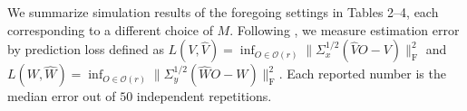\documentclass[11pt]{article}
\newcommand{\nb}[1]{\textcolor{orange}{\texttt{[#1]}}}
\newcommand{\dc}[1]{\{#1\}} %
\newcommand{\0}{{\mathbf{0}}}
\begin{document}
We summarize simulation results of the foregoing settings in Tables 2--4, 
each corresponding to a different choice of $M$. 
Following \cite{gao2017sparse}, we measure estimation error by prediction loss defined as $L(V,\widehat{V})=\inf_{O\in \mathcal{O}(r)}\|\Sigma_x^{1/2}(\widehat{V} O-V)\|_\mathrm{F}^2$
 and 
$L(W,\widehat{W})=\inf_{O\in \mathcal{O}(r)}\|\Sigma_y^{1/2}(\widehat{W} O-W)\|_\mathrm{F}^2$. 
Each reported number is the median error out of $50$ independent repetitions. 
\end{document}
